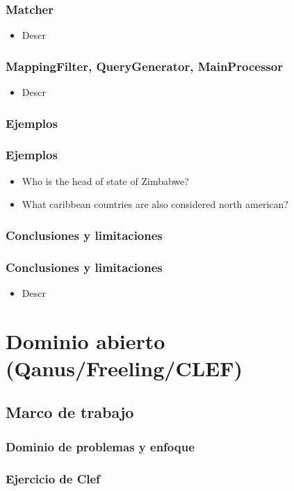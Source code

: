 \documentclass{beamer}
\begin{document}
\begin{frame}
\frametitle{Matcher}
  \begin{itemize}
    \item Descr
  \end{itemize}
\end{frame}

\begin{frame}
\frametitle{MappingFilter, QueryGenerator, MainProcessor}
  \begin{itemize}
    \item Descr
  \end{itemize}
\end{frame}
\subsubsection*{Ejemplos}
\begin{frame}
\frametitle{Ejemplos}
  \begin{itemize}
    \item Who is the head of state of Zimbabwe?
    \item What caribbean countries are also considered north american?
  \end{itemize}
\end{frame}
\subsubsection*{Conclusiones y limitaciones}
\begin{frame}
\frametitle{Conclusiones y limitaciones}
  \begin{itemize}
    \item Descr
  \end{itemize}
\end{frame}
\section{Dominio abierto (Qanus/Freeling/CLEF)}
\subsection{Marco de trabajo}
\subsubsection*{Dominio de problemas y enfoque}
\subsubsection*{Ejercicio de Clef}
\end{document}
